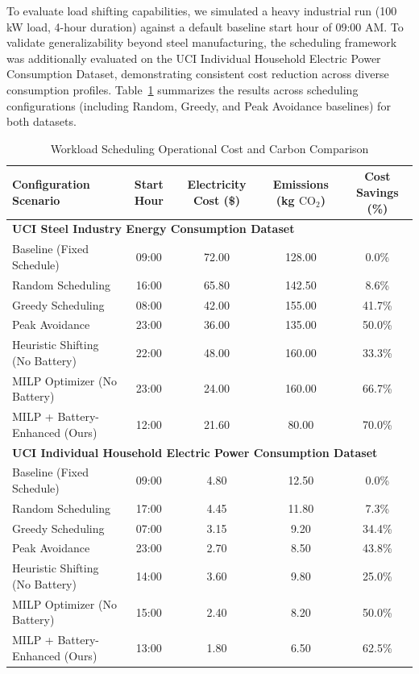 \documentclass[journal]{IEEEtran}
\begin{document}
To evaluate load shifting capabilities, we simulated a heavy industrial run (100 kW load, 4-hour duration) against a default baseline start hour of 09:00 AM. To validate generalizability beyond steel manufacturing, the scheduling framework was additionally evaluated on the UCI Individual Household Electric Power Consumption Dataset, demonstrating consistent cost reduction across diverse consumption profiles. Table~\ref{tab:cost_comparison} summarizes the results across scheduling configurations (including Random, Greedy, and Peak Avoidance baselines) for both datasets.

\begin{table}[htbp]
\centering
\caption{Workload Scheduling Operational Cost and Carbon Comparison}
\label{tab:cost_comparison}
\begin{tabular}{lcccc}
\toprule
\textbf{Configuration Scenario} & \textbf{Start Hour} & \textbf{Electricity Cost (\$)} & \textbf{Emissions (kg $\text{CO}_2$)} & \textbf{Cost Savings (\%)} \\
\midrule
\multicolumn{5}{l}{\textbf{UCI Steel Industry Energy Consumption Dataset}} \\
\midrule
Baseline (Fixed Schedule) & 09:00 & 72.00 & 128.00 & 0.0\% \\
Random Scheduling & 16:00 & 65.80 & 142.50 & 8.6\% \\
Greedy Scheduling & 08:00 & 42.00 & 155.00 & 41.7\% \\
Peak Avoidance & 23:00 & 36.00 & 135.00 & 50.0\% \\
Heuristic Shifting (No Battery) & 22:00 & 48.00 & 160.00 & 33.3\% \\
MILP Optimizer (No Battery) & 23:00 & 24.00 & 160.00 & 66.7\% \\
MILP + Battery-Enhanced (Ours) & 12:00 & 21.60 & 80.00 & 70.0\% \\
\midrule
\multicolumn{5}{l}{\textbf{UCI Individual Household Electric Power Consumption Dataset}} \\
\midrule
Baseline (Fixed Schedule) & 09:00 & 4.80 & 12.50 & 0.0\% \\
Random Scheduling & 17:00 & 4.45 & 11.80 & 7.3\% \\
Greedy Scheduling & 07:00 & 3.15 & 9.20 & 34.4\% \\
Peak Avoidance & 23:00 & 2.70 & 8.50 & 43.8\% \\
Heuristic Shifting (No Battery) & 14:00 & 3.60 & 9.80 & 25.0\% \\
MILP Optimizer (No Battery) & 15:00 & 2.40 & 8.20 & 50.0\% \\
MILP + Battery-Enhanced (Ours) & 13:00 & 1.80 & 6.50 & 62.5\% \\
\bottomrule
\end{tabular}
\end{table}
\end{document}
